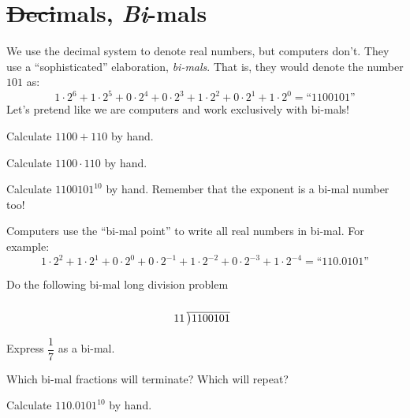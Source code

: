 \newpage
\section{\sout{Deci}mals, \textit{Bi}-mals}


We use the decimal system to denote real numbers, but computers
don't. They use a ``sophisticated'' elaboration, \textit{bi-mals}.
That is, they would denote the number $101$ as:
\[
1\cdot 2^6 + 1\cdot 2^5 + 0 \cdot 2^4 + 0\cdot 2^3 + 1 \cdot 2^2 + 0 \cdot 2^1 + 1\cdot 2^0 = \text{``1100101''}
\]
Let's pretend like we are computers and work exclusively with bi-mals!

\begin{prob}
Calculate $1100+110$ by hand.
\end{prob}

\begin{prob}
Calculate $1100\cdot 110$ by hand.
\end{prob}


\begin{prob}
Calculate $1100101^{10}$ by hand. Remember that the exponent is a
bi-mal number too!
\end{prob}


Computers use the ``bi-mal point'' to write all real numbers in
bi-mal.  For example:
\[
1\cdot 2^2 + 1\cdot 2^1 + 0 \cdot 2^0 + 0\cdot 2^{-1} + 1 \cdot 2^{-2} + 0 \cdot 2^{-3} + 1\cdot 2^{-4} = \text{``110.0101''}
\]


\begin{prob}
Do the following bi-mal long division problem
\[
11\,\begin{array}[b]{@{}r@{}r} 
 & \\ 
\cline{1-1}
\big)\begin{array}[t]{@{}l@{}} 1100101 
\end{array}
\end{array}
\]
\end{prob}

\begin{prob} Express $\dfrac{1}{7}$ as a bi-mal. 
\end{prob}

\begin{prob} Which bi-mal fractions will terminate? Which will repeat?
\end{prob}

\begin{prob}
Calculate $110.0101^{10}$ by hand. 
\end{prob}


